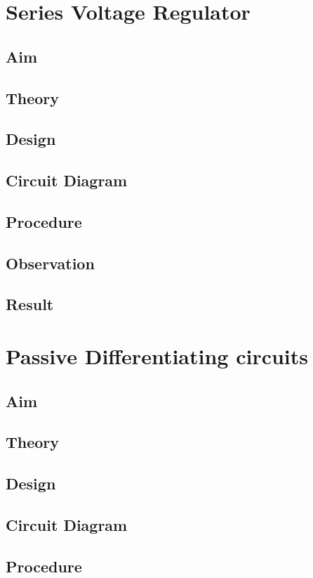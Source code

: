 \documentclass{book}
\begin{document}
\chapter[Series Voltage Regulator]{Series Voltage Regulator}
\section*{Aim}
\section*{Theory}
\section*{Design}
\section*{Circuit Diagram}
\section*{Procedure}
\section*{Observation}
\section*{Result}
\chapter[Passive Differentiating circuits]{Passive Differentiating circuits}
\section*{Aim}
\section*{Theory}
\section*{Design}
\section*{Circuit Diagram}
\section*{Procedure}
\end{document}
